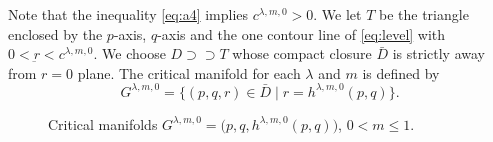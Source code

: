 \documentclass[a4paper,11pt]{article}
\numberwithin{step}{dummy}
\begin{document}
Note that the inequality \eqref{eq:a4} implies $c^{ \lambda,m,0}>0$. We let $T$ be the triangle enclosed by the $p$-axis, $q$-axis and the one contour line of \eqref{eq:level} with $0<\underbar{r} < c^{\lambda,m,0}$. We choose $D \supset\supset T$ whose compact closure $\bar{D}$ is strictly away from $r=0$ plane. The critical manifold for each $\lambda$ and $m$ is defined by 
\begin{equation}
 G^{\lambda,m,0} = \{(p,q,r) \in \bar{D} \;|\; r=h^{\lambda,m,0}(p,q)\}.
\end{equation}

\begin{figure}[h]
  \centering
   \quad \qquad \qquad
  \caption{Critical manifolds $G^{\lambda,m,0}=\big(p,q,h^{ \lambda,m,0}(p,q)\big)$, $0<m\le1$.}
  \label{fig:level}
\end{figure}
\end{document}
